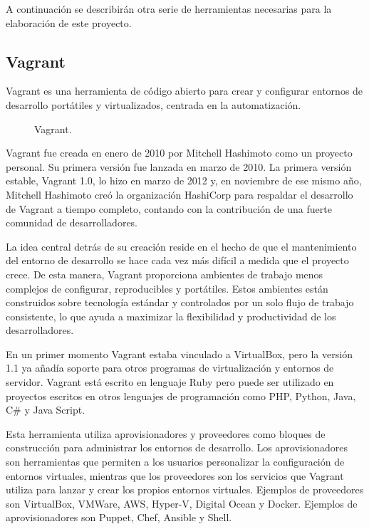 A continuación se describirán otra serie de herramientas necesarias para la elaboración de este proyecto.

\subsection{Vagrant}

Vagrant es una herramienta de código abierto para crear y configurar entornos de desarrollo portátiles y virtualizados, centrada en la automatización.

\begin{figure}[H]
\caption{Vagrant.\label{fig:figure_placement_example}}
\end{figure}

Vagrant fue creada en enero de 2010 por Mitchell Hashimoto como un proyecto personal. Su primera versión fue lanzada en marzo de 2010. La primera versión estable, Vagrant 1.0, lo hizo en marzo de 2012 y, en noviembre de ese mismo año, Mitchell Hashimoto creó la organización HashiCorp para respaldar el desarrollo de Vagrant a tiempo completo, contando con la contribución de una fuerte comunidad de desarrolladores.

La idea central detrás de su creación reside en el hecho de que el mantenimiento del entorno de desarrollo se hace cada vez más difícil a medida que el proyecto crece. De esta manera, Vagrant proporciona ambientes de trabajo menos complejos de configurar, reproducibles y portátiles. Estos ambientes están construidos sobre tecnología estándar y controlados por un solo flujo de trabajo consistente, lo que ayuda a maximizar la flexibilidad y productividad de los desarrolladores.

En un primer momento Vagrant estaba vinculado a VirtualBox, pero la versión 1.1 ya añadía soporte para otros programas de virtualización y entornos de servidor. Vagrant está escrito en lenguaje Ruby pero puede ser utilizado en proyectos escritos en otros lenguajes de programación como PHP, Python, Java, C\# y Java Script.

Esta herramienta utiliza aprovisionadores y proveedores como bloques de construcción para administrar los entornos de desarrollo. Los aprovisionadores son herramientas que permiten a los usuarios personalizar la configuración de entornos virtuales, mientras que los proveedores son los servicios que Vagrant utiliza para lanzar y crear los propios entornos virtuales. Ejemplos de proveedores son VirtualBox, VMWare, AWS, Hyper-V, Digital Ocean y Docker. Ejemplos de aprovisionadores son Puppet, Chef, Ansible y Shell.

